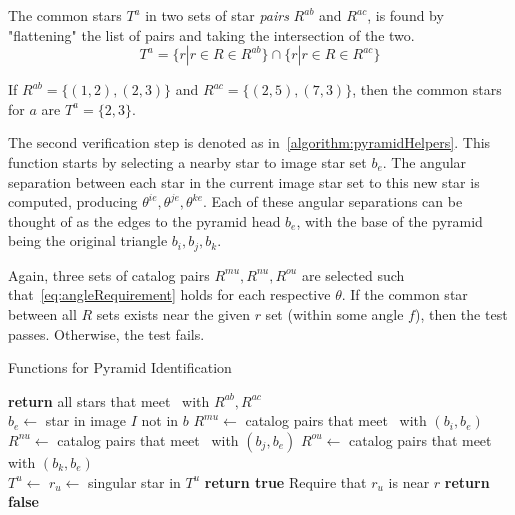 The common stars $T^a$ in two sets of star \textit{pairs} $R^{ab}$ and $R^{ac}$, is found by "flattening" the list of
pairs and taking the intersection of the two.
\begin{equation}
    \label{eq:commonStarsPyramid}
    T^a = \{ r | r \in R \in R^{ab} \} \cap \{ r | r \in R \in R^{ac} \}
\end{equation}

If $R^{ab} = \{ (1, 2), (2, 3) \}$ and $R^{ac} = \{ (2, 5), (7, 3) \}$, then the common stars for $a$ are
$T^a = \{2, 3\}$.


The second verification step is denoted as  in~\autoref{algorithm:pyramidHelpers}.
This function starts by selecting a nearby star to image star set $b_e$.
The angular separation between each star in the current image star set to this new star is computed, producing
$\theta^{ie}, \theta^{je}, \theta^{ke}$.
Each of these angular separations can be thought of as the edges to the pyramid head $b_e$, with the base of the pyramid
being the original triangle $b_i, b_j, b_k$.

Again, three sets of catalog pairs $R^{mu}, R^{nu}, R^{ou}$ are selected such that~\autoref{eq:angleRequirement} holds
for each respective $\theta$.
If the common star between all $R$ sets exists near the given $r$ set (within some angle $f$), then the test passes.
Otherwise, the test fails.

\begin{algorithm}
    \caption{Functions for Pyramid Identification} \label{algorithm:pyramidHelpers}
    \begin{algorithmic}[1]
        \State \textbf{return} all stars that meet~ with $R^{ab}, R^{ac}$
        \EndFunction
        \\
        \State $b_e \gets $ star in image $I$ not in $b$
        \State $R^{mu} \gets$ catalog pairs that meet~ with $(b_i, b_e)$
        \State $R^{nu} \gets$ catalog pairs that meet~ with $(b_j, b_e)$
        \State $R^{ou} \gets$ catalog pairs that meet~ with $(b_k, b_e)$
        \\
        \State $T^u \gets $ 
        \State $r_u \gets $ singular star in $T^u$
        \State \textbf{return true} \Comment Require that $r_u$ is near $r$
        \EndIf
        \EndIf
        \State \textbf{return false}
        \EndFunction
    \end{algorithmic}
\end{algorithm}

